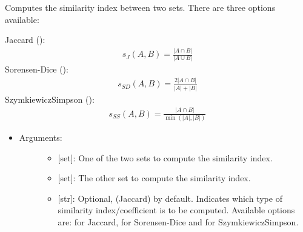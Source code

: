 \documentclass[letterpaper,10pt,english]{sphinxmanual}
\begin{document}

\begin{fulllineitems}
\label{\detokenize{iterables:data_tools.iterables.similarity}}
Computes the similarity index between two sets. There are three
options available:

Jaccard ():
\begin{equation*}
\begin{split}s_J(A,B) = \frac{|A\cap B|}{|A\cup B|}\end{split}
\end{equation*}
Sorensen-Dice ():
\begin{equation*}
\begin{split}s_{SD}(A,B) = \frac{2|A\cap B|}{|A|+|B|}\end{split}
\end{equation*}
Szymkiewicz\textendash{}Simpson ():
\begin{equation*}
\begin{split}s_{SS}(A,B) = \frac{|A\cap B|}{\min(|A|,|B|)}\end{split}
\end{equation*}\begin{itemize}
\item {} \begin{description}
\item[{Arguments:}] \leavevmode\begin{itemize}
\item {} 
 {[}set{]}: One of the two sets to compute the similarity
index.

\item {} 
 {[}set{]}: The other set to compute the similarity index.

\item {} 
 {[}str{]}: Optional,  (Jaccard) by default.
Indicates which type of similarity index/coefficient is to be
computed. Available options are:  for Jaccard, 
for Sorensen-Dice and  for Szymkiewicz\textendash{}Simpson.


\end{itemize}
\end{description}
\end{itemize}
\end{fulllineitems}
\end{document}
